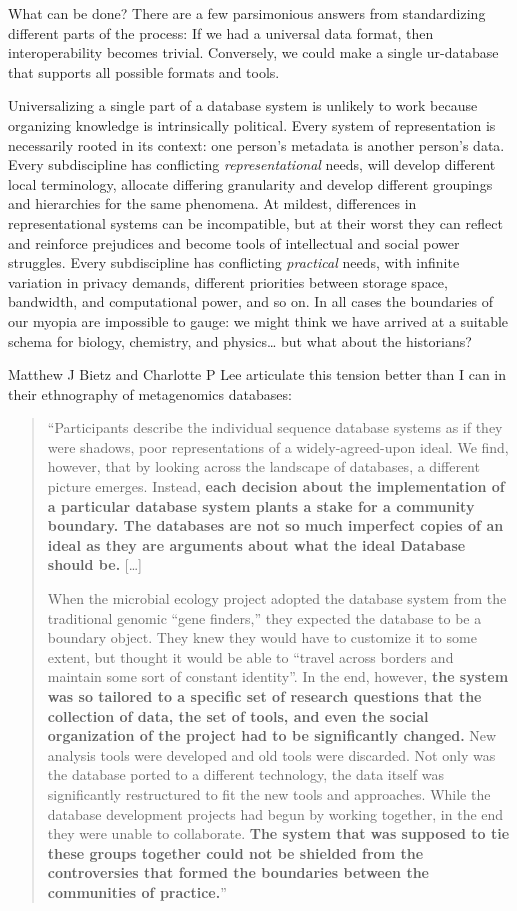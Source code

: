 \documentclass[notoc]{tufte-book}
\begin{document}
What can be done? There are a few parsimonious answers from
standardizing different parts of the process: If we had a universal data
format, then interoperability becomes trivial. Conversely, we could make
a single ur-database that supports all possible formats and tools.

Universalizing a single part of a database system is unlikely to work
because organizing knowledge is intrinsically political. Every system of
representation is necessarily rooted in its context: one person's
metadata is another person's data. Every subdiscipline has conflicting
\emph{representational} needs, will develop different local terminology,
allocate differing granularity and develop different groupings and
hierarchies for the same phenomena. At mildest, differences in
representational systems can be incompatible, but at their worst they
can reflect and reinforce prejudices and become tools of intellectual
and social power struggles. Every subdiscipline has conflicting
\emph{practical} needs, with infinite variation in privacy demands,
different priorities between storage space, bandwidth, and computational
power, and so on. In all cases the boundaries of our myopia are
impossible to gauge: we might think we have arrived at a suitable schema
for biology, chemistry, and physics\ldots{} but what about the
historians?

Matthew J Bietz and Charlotte P Lee articulate this tension better than
I can in their ethnography of metagenomics databases:

\begin{quote}
``Participants describe the individual sequence database systems as if
they were shadows, poor representations of a widely-agreed-upon ideal.
We find, however, that by looking across the landscape of databases, a
different picture emerges. Instead, \textbf{each decision about the
implementation of a particular database system plants a stake for a
community boundary. The databases are not so much imperfect copies of an
ideal as they are arguments about what the ideal Database should be.}
{[}\ldots{]}

When the microbial ecology project adopted the database system from the
traditional genomic ``gene finders,'' they expected the database to be a
boundary object. They knew they would have to customize it to some
extent, but thought it would be able to ``travel across borders and
maintain some sort of constant identity''. In the end, however,
\textbf{the system was so tailored to a specific set of research
questions that the collection of data, the set of tools, and even the
social organization of the project had to be significantly changed.} New
analysis tools were developed and old tools were discarded. Not only was
the database ported to a different technology, the data itself was
significantly restructured to fit the new tools and approaches. While
the database development projects had begun by working together, in the
end they were unable to collaborate. \textbf{The system that was
supposed to tie these groups together could not be shielded from the
controversies that formed the boundaries between the communities of
practice.}'' \citep{bietzCollaborationMetagenomicsSequence2009} 
\end{quote}
\end{document}
